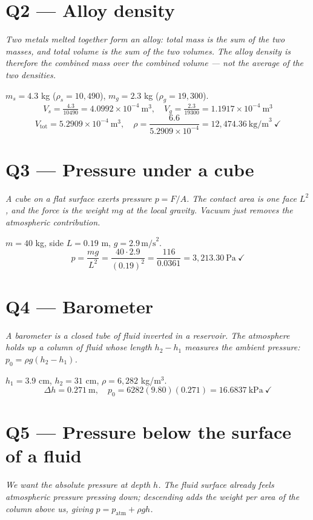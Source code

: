 \documentclass[11pt]{article}
\newcommand{\checkmk}{\ensuremath{\checkmark}}
\begin{document}
\section*{Q2 --- Alloy density}
\emph{Two metals melted together form an alloy: total mass is the sum of the two masses, and total volume is the sum of the two volumes. The alloy density is therefore the combined mass over the combined volume --- not the average of the two densities.}

$m_s = 4.3$ kg ($\rho_s = 10{,}490$), $m_g = 2.3$ kg ($\rho_g = 19{,}300$).
\[ V_s = \tfrac{4.3}{10490} = 4.0992\times 10^{-4}\ \text{m}^3,\quad V_g = \tfrac{2.3}{19300} = 1.1917\times 10^{-4}\ \text{m}^3 \]
\[ V_{\text{tot}} = 5.2909\times 10^{-4}\ \text{m}^3,\quad \rho = \frac{6.6}{5.2909\times 10^{-4}} = \boxed{12{,}474.36\ \text{kg/m}^3}\ \checkmk \]

\section*{Q3 --- Pressure under a cube}
\emph{A cube on a flat surface exerts pressure $p = F/A$. The contact area is one face $L^2$, and the force is the weight $mg$ at the local gravity. Vacuum just removes the atmospheric contribution.}

$m=40$ kg, side $L=0.19$ m, $g=2.9\,\text{m/s}^2$.
\[ p = \frac{mg}{L^2} = \frac{40\cdot 2.9}{(0.19)^2} = \frac{116}{0.0361} = \boxed{3{,}213.30\ \text{Pa}}\ \checkmk \]

\section*{Q4 --- Barometer}
\emph{A barometer is a closed tube of fluid inverted in a reservoir. The atmosphere holds up a column of fluid whose length $h_2 - h_1$ measures the ambient pressure: $p_0 = \rho g (h_2-h_1)$.}

$h_1=3.9$ cm, $h_2=31$ cm, $\rho=6{,}282$ kg/m$^3$.
\[ \Delta h = 0.271\ \text{m},\quad p_0 = 6282(9.80)(0.271) = \boxed{16.6837\ \text{kPa}}\ \checkmk \]

\section*{Q5 --- Pressure below the surface of a fluid}
\emph{We want the absolute pressure at depth $h$. The fluid surface already feels atmospheric pressure pressing down; descending adds the weight per area of the column above us, giving $p = p_{\text{atm}} + \rho g h$.}
\end{document}
